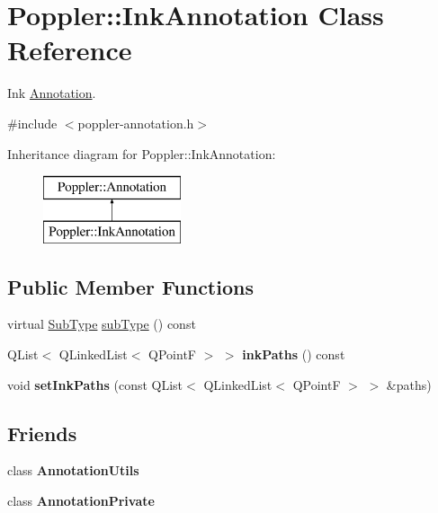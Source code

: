 \hypertarget{class_poppler_1_1_ink_annotation}{}\section{Poppler\+:\+:Ink\+Annotation Class Reference}
\label{class_poppler_1_1_ink_annotation}


Ink \hyperlink{class_poppler_1_1_annotation}{Annotation}.  




{\ttfamily \#include $<$poppler-\/annotation.\+h$>$}

Inheritance diagram for Poppler\+:\+:Ink\+Annotation\+:\begin{figure}[H]
\begin{center}
\leavevmode
\includegraphics[height=2.000000cm]{class_poppler_1_1_ink_annotation}
\end{center}
\end{figure}
\subsection*{Public Member Functions}
\begin{DoxyCompactItemize}
\item 
virtual \hyperlink{class_poppler_1_1_annotation_a2d592999c330949d64679cfa9e81113f}{Sub\+Type} \hyperlink{class_poppler_1_1_ink_annotation_a800926980dc58d7b1d805f0ca8bab73f}{sub\+Type} () const
\item 
\mbox{\label{class_poppler_1_1_ink_annotation_a134209c77f832ba800880b6211d90f39}} 
Q\+List$<$ Q\+Linked\+List$<$ Q\+PointF $>$ $>$ {\bfseries ink\+Paths} () const
\item 
\mbox{\label{class_poppler_1_1_ink_annotation_aae3d9481b16e6a4672dfbcd68401343d}} 
void {\bfseries set\+Ink\+Paths} (const Q\+List$<$ Q\+Linked\+List$<$ Q\+PointF $>$ $>$ \&paths)
\end{DoxyCompactItemize}
\subsection*{Friends}
\begin{DoxyCompactItemize}
\item 
\mbox{\label{class_poppler_1_1_ink_annotation_a13daac1cbc1823e18498579fc26b344f}} 
class {\bfseries Annotation\+Utils}
\item 
\mbox{\label{class_poppler_1_1_ink_annotation_add0bc3e32e560f9e9eb3025587c1ad54}} 
class {\bfseries Annotation\+Private}
\end{DoxyCompactItemize}

